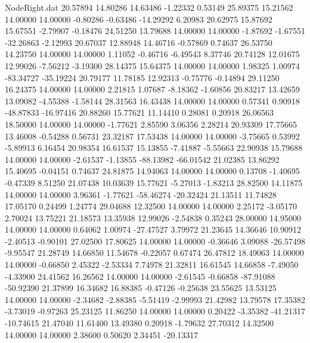 \begin{filecontents}{NodeRight.dat}
  20.57894   14.80286   14.63486    -1.22332    0.53149   25.89375   15.21562   14.00000   14.00000   -0.80286   -0.63486  -14.29292    6.20983
  20.62975   15.87692   15.67551    -2.79907   -0.18476   24.51250   13.79688   14.00000   14.00000   -1.87692   -1.67551  -32.26863   -2.12993
  20.67037   12.88948   14.46716    -0.57869    0.74637   26.53750   14.23750   14.00000   14.00000    1.11052   -0.46716   -6.49543    8.37746
  20.74128   12.01675   12.99026    -7.56212   -3.19300   28.14375   15.64375   14.00000   14.00000    1.98325    1.00974  -83.34727  -35.19224
  20.79177   11.78185   12.92313    -0.75776   -0.14894   29.11250   16.24375   14.00000   14.00000    2.21815    1.07687   -8.18362   -1.60856
  20.83217   13.42659   13.09082    -4.55388   -1.58144   28.31563   16.43438   14.00000   14.00000    0.57341    0.90918  -48.87833  -16.97416
  20.88260   15.77621   11.14410     0.28081    0.20918   26.06563   18.50000   14.00000   14.00000   -1.77621    2.85590    3.06356    2.28214
  20.93309   17.75665   13.46008    -0.54288    0.56731   23.32187   17.53438   14.00000   14.00000   -3.75665    0.53992   -5.89913    6.16454
  20.98354   16.61537   15.13855    -7.41887   -5.55663   22.90938   15.79688   14.00000   14.00000   -2.61537   -1.13855  -88.13982  -66.01542
  21.02385   13.86292   15.40695    -0.04151    0.74637   24.81875   14.94063   14.00000   14.00000    0.13708   -1.40695   -0.47339    8.51250
  21.07438   10.03639   15.77621    -5.27013   -1.83213   28.82500   14.11875   14.00000   14.00000    3.96361   -1.77621  -58.46274  -20.32424
  21.13511   11.74828   17.05170     0.24499    1.24774   29.04688   12.32500   14.00000   14.00000    2.25172   -3.05170    2.70024   13.75221
  21.18573   13.35938   12.99026    -2.54838    0.35243   28.00000   14.95000   14.00000   14.00000    0.64062    1.00974  -27.47527    3.79972
  21.23645   14.36646   10.90912    -2.40513   -0.90101   27.02500   17.80625   14.00000   14.00000   -0.36646    3.09088  -26.57498   -9.95547
  21.28749   14.66850   11.54678    -0.22057    0.67474   26.47812   18.49063   14.00000   14.00000   -0.66850    2.45322   -2.53334    7.74978
  21.32811   16.61545   14.66858    -7.49050   -4.33900   24.41562   16.26562   14.00000   14.00000   -2.61545   -0.66858  -87.91088  -50.92390
  21.37899   16.34682   16.88385    -0.47126   -0.25638   23.55625   13.53125   14.00000   14.00000   -2.34682   -2.88385   -5.51419   -2.99993
  21.42982   13.79578   17.35382    -3.73019   -0.97263   25.23125   11.86250   14.00000   14.00000    0.20422   -3.35382  -41.21317  -10.74615
  21.47040   11.61400   13.49380     0.20918   -1.79632   27.70312   14.32500   14.00000   14.00000    2.38600    0.50620    2.34451  -20.13317

\end{filecontents}
